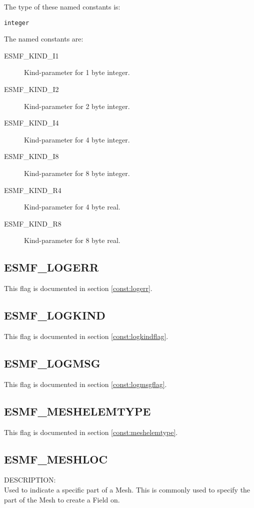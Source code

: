 The type of these named constants is:

{\tt integer}

The named constants are:
\begin{description}
\item [ESMF\_KIND\_I1]
      Kind-parameter for 1 byte integer.
\item [ESMF\_KIND\_I2]
      Kind-parameter for 2 byte integer.
\item [ESMF\_KIND\_I4]
      Kind-parameter for 4 byte integer.
\item [ESMF\_KIND\_I8]
      Kind-parameter for 8 byte integer.
\item [ESMF\_KIND\_R4]
      Kind-parameter for 4 byte real.
\item [ESMF\_KIND\_R8]
      Kind-parameter for 8 byte real.
\end{description}

\subsection{ESMF\_LOGERR}
This flag is documented in section \ref{const:logerr}.

\subsection{ESMF\_LOGKIND}
This flag is documented in section \ref{const:logkindflag}.

\subsection{ESMF\_LOGMSG}
This flag is documented in section \ref{const:logmsgflag}.

\subsection{ESMF\_MESHELEMTYPE}
This flag is documented in section \ref{const:meshelemtype}.

\subsection{ESMF\_MESHLOC}
\label{const:meshloc}
{\sf DESCRIPTION:\\}  
Used to indicate a specific part of a Mesh. This is commonly used to specify the part of the Mesh to
create a Field on. 

